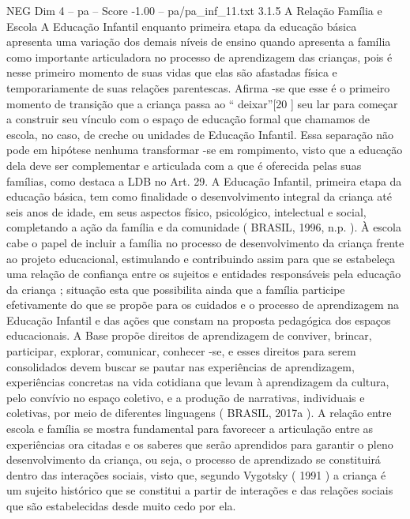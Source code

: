 \begin{textsample}{NEG Dim 4 – pa – Score -1.00 – pa/pa\_inf\_11.txt}  \label{ex:f4_neg_280}
3.1.5 A Relação Família e Escola A Educação Infantil enquanto primeira etapa da educação básica apresenta uma variação dos demais níveis de ensino quando apresenta a família como importante articuladora no processo de aprendizagem das crianças, pois é nesse primeiro momento de suas vidas que elas são afastadas física e temporariamente de suas relações parentescas.
Afirma -se que esse é o primeiro momento de transição que a criança passa ao “ deixar”[20 ] seu lar para começar a construir seu vínculo com o espaço de educação formal que chamamos de escola, no caso, de creche ou unidades de Educação Infantil.
Essa separação não pode em hipótese nenhuma transformar -se em rompimento, visto que a educação dela deve ser complementar e articulada com a que é oferecida pelas suas famílias, como destaca a LDB no Art. 29.
A Educação Infantil, primeira etapa da educação básica, tem como finalidade o desenvolvimento integral da criança até seis anos de idade, em seus aspectos físico, psicológico, intelectual e social, completando a ação da família e da comunidade ( BRASIL, 1996, n.p. ).
À escola cabe o papel de incluir a família no processo de desenvolvimento da criança frente ao projeto educacional, estimulando e contribuindo assim para que se estabeleça uma relação de confiança entre os sujeitos e entidades responsáveis pela educação da criança ; situação esta que possibilita ainda que a família participe efetivamente do que se propõe para os cuidados e o processo de aprendizagem na Educação Infantil e das ações que constam na proposta pedagógica dos espaços educacionais.
A Base propõe direitos de aprendizagem de conviver, brincar, participar, explorar, comunicar, conhecer -se, e esses direitos para serem consolidados devem buscar se pautar nas experiências de aprendizagem, experiências concretas na vida cotidiana que levam à aprendizagem da cultura, pelo convívio no espaço coletivo, e a produção de narrativas, individuais e coletivas, por meio de diferentes linguagens ( BRASIL, 2017a ).
A relação entre escola e família se mostra fundamental para favorecer a articulação entre as experiências ora citadas e os saberes que serão aprendidos para garantir o pleno desenvolvimento da criança, ou seja, o processo de aprendizado se constituirá dentro das interações sociais, visto que, segundo Vygotsky ( 1991 ) a criança é um sujeito histórico que se constitui a partir de interações e das relações sociais que são estabelecidas desde muito cedo por ela.

\end{textsample}
